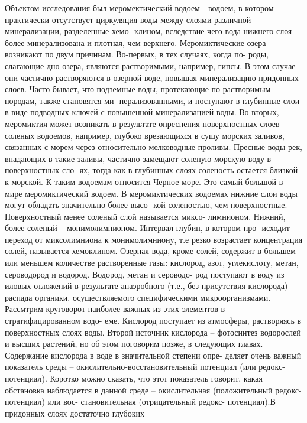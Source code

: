 

Объектом исследования был меромектический водоем - водоем, в котором практически
отсутствует циркуляция воды между слоями различной минерализации, разделенные хемо-
клином, вследствие чего вода нижнего слоя более минерализована и плотная, чем верхнего.
Меромиктические озера возникают по двум причинам. Во-первых, в тех случаях, когда по-
роды, слагающие дно озера, являются растворимыми, например, гипсы. В этом случае они
частично растворяются в озерной воде, повышая минерализацию придонных слоев. Часто
бывает, что подземные воды, протекающие по растворимым породам, также становятся ми-
нерализованными, и поступают в глубинные слои в виде подводных ключей с повышенной
минерализацией воды. Во-вторых, меромиктия может возникать в результате опреснения
поверхностных слоев соленых водоемов, например, глубоко врезающихся в сушу морских
заливов, связанных с морем через относительно мелководные проливы. Пресные воды рек,
впадающих в такие заливы, частично замещают соленую морскую воду в поверхностных сло-
ях, тогда как в глубинных слоях соленость остается близкой к морской. К таким водоемам
относится Черное море. Это самый большой в мире меромиктический водоем.
В меромиктических водоемах нижние слои воды могут обладать значительно более высо-
кой соленостью, чем поверхностные. Поверхностный менее соленый слой называется миксо-
лимнионом. Нижний, более соленый – монимолимнионом. Интервал глубин, в котором про-
исходит переход от миксолимниона к монимолимниону, т.е резко возрастает концентрация
солей, называется хемоклином.
Озерная вода, кроме солей, содержит в большем или меньшем количестве растворенные
газы: кислород, азот, углекислоту, метан, сероводород и водород. Водород, метан и сероводо-
род поступают в воду из иловых отложений в результате анаэробного (т.е., без присутствия
кислорода) распада органики, осуществляемого специфическими микроорганизмами.
Рассмтрим круговорот наиболее важных из этих элементов в стратифицированном водо-
еме. Кислород поступает из атмосферы, растворяясь в поверхностных слоях воды. Второй
источник кислорода – фотосинтез водорослей и высших растений, но об этом поговорим
позже, в следующих главах. Содержание кислорода в воде в значительной степени опре-
деляет очень важный показатель среды – окислительно-восстановительный потенциал (или
редокс-потенциал). Коротко можно сказать, что этот показатель говорит, какая обстановка
наблюдается в данной среде – окислительная (положительный редокс-потенциал) или вос-
становительная (отрицательный редокс- потенциал).В придонных слоях достаточно глубоких
